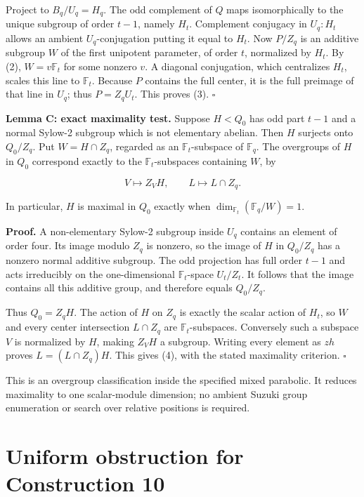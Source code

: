 \documentclass[11pt,a4paper]{article}
\begin{document}
Project to \(B_q/U_q=H_q\). The odd complement of \(Q\) maps
isomorphically to the unique subgroup of order \(t-1\), namely \(H_t\).
Complement conjugacy in \(U_q:H_t\) allows an ambient
\(U_q\)-conjugation putting it equal to \(H_t\). Now \(P/Z_q\) is an
additive subgroup \(W\) of the first unipotent parameter, of order
\(t\), normalized by \(H_t\). By (2), \(W=v\mathbb F_t\) for some
nonzero \(v\). A diagonal conjugation, which centralizes \(H_t\), scales
this line to \(\mathbb F_t\). Because \(P\) contains the full center, it
is the full preimage of that line in \(U_q\); thus \(P=Z_qU_t\). This
proves (3). \(\square\)

\textbf{Lemma C: exact maximality test.} Suppose \(H<Q_0\) has odd part
\(t-1\) and a normal Sylow-2 subgroup which is not elementary abelian.
Then \(H\) surjects onto \(Q_0/Z_q\). Put \(W=H\cap Z_q\), regarded as
an \(\mathbb F_t\)-subspace of \(\mathbb F_q\). The overgroups of \(H\)
in \(Q_0\) correspond exactly to the \(\mathbb F_t\)-subspaces
containing \(W\), by

\[
 V\longmapsto Z_VH,\qquad
 L\longmapsto L\cap Z_q.
\tag{4}
\]

In particular, \(H\) is maximal in \(Q_0\) exactly when
\(\dim_{\mathbb F_t}(\mathbb F_q/W)=1\).

\textbf{Proof.} A non-elementary Sylow-2 subgroup inside \(U_q\)
contains an element of order four. Its image modulo \(Z_q\) is nonzero,
so the image of \(H\) in \(Q_0/Z_q\) has a nonzero normal additive
subgroup. The odd projection has full order \(t-1\) and acts irreducibly
on the one-dimensional \(\mathbb F_t\)-space \(U_t/Z_t\). It follows
that the image contains all this additive group, and therefore equals
\(Q_0/Z_q\).

Thus \(Q_0=Z_qH\). The action of \(H\) on \(Z_q\) is exactly the scalar
action of \(H_t\), so \(W\) and every center intersection \(L\cap Z_q\)
are \(\mathbb F_t\)-subspaces. Conversely such a subspace \(V\) is
normalized by \(H\), making \(Z_VH\) a subgroup. Writing every element
as \(zh\) proves \(L=(L\cap Z_q)H\). This gives (4), with the stated
maximality criterion. \(\square\)

This is an overgroup classification inside the specified mixed
parabolic. It reduces maximality to one scalar-module dimension; no
ambient Suzuki group enumeration or search over relative positions is
required.

\section{Uniform obstruction for Construction
10}\label{uniform-obstruction-for-construction-10}
\end{document}
